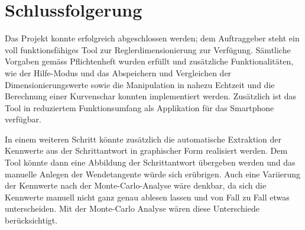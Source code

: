 \chapter{Schlussfolgerung}

Das Projekt konnte erfolgreich abgeschlossen werden; dem Auftraggeber steht ein voll funktionsfähiges Tool zur Reglerdimensionierung zur Verfügung. Sämtliche Vorgaben gemäss Pflichtenheft wurden erfüllt und zusätzliche Funktionalitäten, wie der Hilfe-Modus und das Abspeichern und Vergleichen der Dimensionierungswerte sowie die Manipulation in nahezu Echtzeit und die Berechnung einer Kurvenschar konnten implementiert werden. Zusätzlich ist das Tool in reduziertem Funktionsumfang als Applikation für das Smartphone verfügbar.

In einem weiteren Schritt könnte zusätzlich die automatische Extraktion der Kennwerte aus der Schrittantwort in graphischer Form realisiert werden. Dem Tool könnte dann eine Abbildung der Schrittantwort übergeben werden und das manuelle Anlegen der Wendetangente würde sich erübrigen. Auch eine Variierung der Kennwerte nach der Monte-Carlo-Analyse wäre denkbar, da sich die Kennwerte manuell nicht ganz genau ablesen lassen und von Fall zu Fall etwas unterscheiden. Mit der Monte-Carlo Analyse wären diese Unterschiede berücksichtigt.